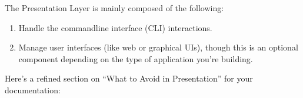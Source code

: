\documentclass[letterpaper,10pt,english]{sphinxhowto}
\begin{document}
\sphinxAtStartPar
The Presentation Layer is mainly composed of the following:
\begin{enumerate}
%
\item {} \begin{description}
\sphinxAtStartPar
Handle the command\sphinxhyphen{}line interface (CLI) interactions.

\end{description}

\item {} \begin{description}
\sphinxAtStartPar
Manage user interfaces (like web or graphical UIs), though this is an optional component depending on the type of application you’re building.

\end{description}

\end{enumerate}

\sphinxAtStartPar
Here’s a refined section on “What to Avoid in Presentation” for your documentation:
\end{document}
